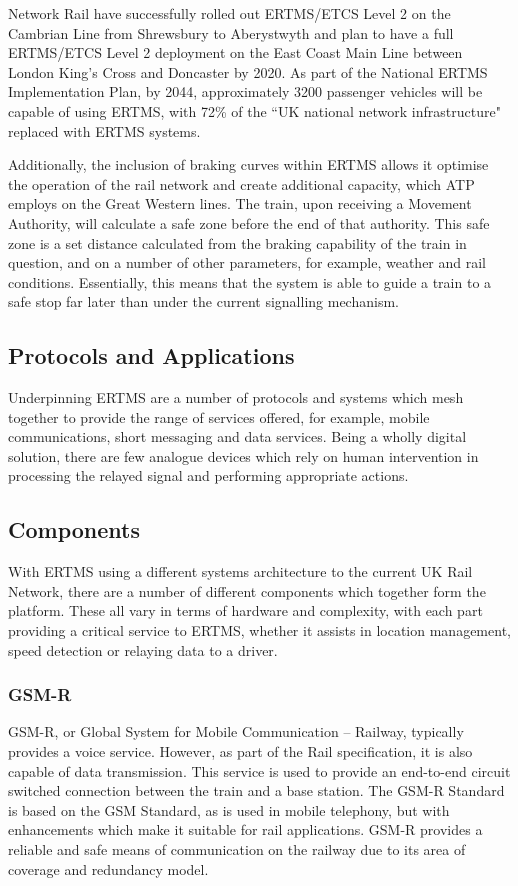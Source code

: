 \documentclass[twoside,11pt,a4paper]{article}
\begin{document}
Network Rail have successfully rolled out ERTMS/ETCS Level 2 on the Cambrian Line from Shrewsbury to Aberystwyth and plan to have a full ERTMS/ETCS Level 2 deployment on the East Coast Main Line between London King's Cross and Doncaster by 2020\citep{NetworkRail15b}. As part of the National ERTMS Implementation Plan, by 2044, approximately 3200 passenger vehicles will be capable of using ERTMS, with 72\% of the ``UK national network infrastructure" replaced with ERTMS systems\citep[pp. 3]{DfT07a}.

Additionally, the inclusion of braking curves within ERTMS allows it optimise the operation of the rail network and create additional capacity, which ATP employs on the Great Western lines. The train, upon receiving a Movement Authority, will calculate a safe zone before the end of that authority. This safe zone is a set distance calculated from the braking capability of the train in question, and on a number of other parameters, for example, weather and rail conditions. Essentially, this means that the system is able to guide a train to a safe stop far later than under the current signalling mechanism.

\subsection{Protocols and Applications}
Underpinning ERTMS are a number of protocols and systems which mesh together to provide the range of services offered, for example, mobile communications, short messaging and data services. Being a wholly digital solution, there are few analogue devices which rely on human intervention in processing the relayed signal and performing appropriate actions.
\subsection{Components}
With ERTMS using a different systems architecture to the current UK Rail Network, there are a number of different components which together form the platform. These all vary in terms of hardware and complexity, with each part providing a critical service to ERTMS, whether it assists in location management, speed detection or relaying data to a driver.
\subsubsection{GSM-R}
GSM-R, or Global System for Mobile Communication -- Railway, typically provides a voice service. However, as part of the Rail specification, it is also capable of data transmission. This service is used to provide an end-to-end circuit switched connection between the train and a base station. The GSM-R Standard is based on the GSM Standard, as is used in mobile telephony, but with enhancements which make it suitable for rail applications. GSM-R provides a reliable and safe means of communication on the railway due to its area of coverage and redundancy model.
\end{document}

